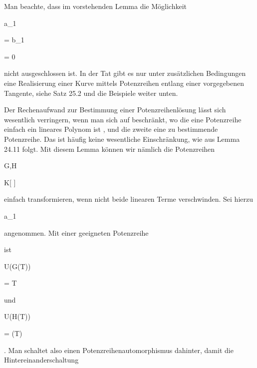 Man beachte, dass im vorstehenden Lemma die Möglichkeit


\mavergleichskette

{\vergleichskette

{ a_1
}

{ = }{ b_1
}

{ = }{ 0
}

{    }{
}

{   }{
}

}
{}{}{}
nicht ausgeschlossen ist. In der Tat gibt es nur unter zusätzlichen Bedingungen eine Realisierung einer Kurve mittels Potenzreihen entlang einer vorgegebenen Tangente, siehe
Satz 25.2
und die Beispiele weiter unten.


Der Rechenaufwand zur Bestimmung einer Potenzreihenlösung lässt sich wesentlich verringern, wenn man sich auf  beschränkt, wo die eine Potenzreihe einfach ein lineares Polynom ist
 {} {,}
und die zweite eine zu bestimmende Potenzreihe. Das ist häufig keine wesentliche Einschränkung, wie aus
Lemma 24.11
folgt. Mit diesem Lemma können wir nämlich die Potenzreihen


\mavergleichskette

{\vergleichskette

{ G,H
}

{ \in }{ K[ \![T]\! ]
}

{  }{
}

{    }{
}

{   }{
}

}
{}{}{}
einfach transformieren, wenn nicht beide linearen Terme verschwinden. Sei hierzu


 {}

 {a_1 } {}

 {} {} {} {}
angenommen. Mit einer geeigneten Potenzreihe

 ist


\mavergleichskette

{\vergleichskette

{ U(G(T))
}

{ = }{ T
}

{  }{
}

{    }{
}

{   }{
}

}
{}{}{}
und


\mavergleichskette

{\vergleichskette

{ U(H(T))
}

{ = }{  (T)
}

{  }{
}

{    }{
}

{   }{
}

}
{}{}{.}
Man schaltet also einen Potenzreihenautomorphismus dahinter, damit die Hintereinanderschaltung


